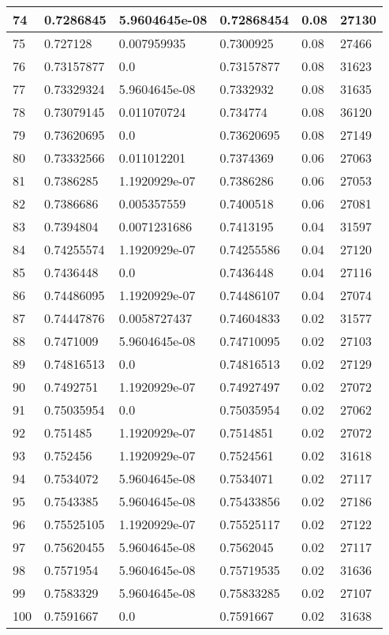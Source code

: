\begin{longtable}{|l|l|l|l|l|l|}
74 & 0.7286845 & 5.9604645e-08 & 0.72868454 & 0.08 & 27130 \\ \hline 
75 & 0.727128 & 0.007959935 & 0.7300925 & 0.08 & 27466 \\ \hline 
76 & 0.73157877 & 0.0 & 0.73157877 & 0.08 & 31623 \\ \hline 
77 & 0.73329324 & 5.9604645e-08 & 0.7332932 & 0.08 & 31635 \\ \hline 
78 & 0.73079145 & 0.011070724 & 0.734774 & 0.08 & 36120 \\ \hline 
79 & 0.73620695 & 0.0 & 0.73620695 & 0.08 & 27149 \\ \hline 
80 & 0.73332566 & 0.011012201 & 0.7374369 & 0.06 & 27063 \\ \hline 
81 & 0.7386285 & 1.1920929e-07 & 0.7386286 & 0.06 & 27053 \\ \hline 
82 & 0.7386686 & 0.005357559 & 0.7400518 & 0.06 & 27081 \\ \hline 
83 & 0.7394804 & 0.0071231686 & 0.7413195 & 0.04 & 31597 \\ \hline 
84 & 0.74255574 & 1.1920929e-07 & 0.74255586 & 0.04 & 27120 \\ \hline 
85 & 0.7436448 & 0.0 & 0.7436448 & 0.04 & 27116 \\ \hline 
86 & 0.74486095 & 1.1920929e-07 & 0.74486107 & 0.04 & 27074 \\ \hline 
87 & 0.74447876 & 0.0058727437 & 0.74604833 & 0.02 & 31577 \\ \hline 
88 & 0.7471009 & 5.9604645e-08 & 0.74710095 & 0.02 & 27103 \\ \hline 
89 & 0.74816513 & 0.0 & 0.74816513 & 0.02 & 27129 \\ \hline 
90 & 0.7492751 & 1.1920929e-07 & 0.74927497 & 0.02 & 27072 \\ \hline 
91 & 0.75035954 & 0.0 & 0.75035954 & 0.02 & 27062 \\ \hline 
92 & 0.751485 & 1.1920929e-07 & 0.7514851 & 0.02 & 27072 \\ \hline 
93 & 0.752456 & 1.1920929e-07 & 0.7524561 & 0.02 & 31618 \\ \hline 
94 & 0.7534072 & 5.9604645e-08 & 0.7534071 & 0.02 & 27117 \\ \hline 
95 & 0.7543385 & 5.9604645e-08 & 0.75433856 & 0.02 & 27186 \\ \hline 
96 & 0.75525105 & 1.1920929e-07 & 0.75525117 & 0.02 & 27122 \\ \hline 
97 & 0.75620455 & 5.9604645e-08 & 0.7562045 & 0.02 & 27117 \\ \hline 
98 & 0.7571954 & 5.9604645e-08 & 0.75719535 & 0.02 & 31636 \\ \hline 
99 & 0.7583329 & 5.9604645e-08 & 0.75833285 & 0.02 & 27107 \\ \hline 
100 & 0.7591667 & 0.0 & 0.7591667 & 0.02 & 31638 \\ \hline 
\end{longtable}